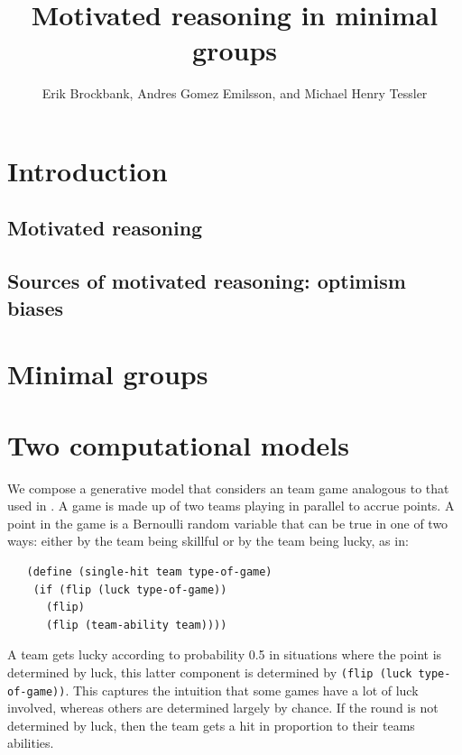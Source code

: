 \documentclass{article}
\begin{document}
 \title{Motivated reasoning in minimal groups}
\author{Erik Brockbank, Andres Gomez Emilsson, and Michael Henry Tessler} \renewcommand{\today}{Psych 241\\June 8,
2014} \maketitle

\section{Introduction}

\subsection{Motivated reasoning}

\subsection{Sources of motivated reasoning: optimism biases}

\section{Minimal groups}

\section{Two computational models}

We compose a generative model that considers an team game analogous to that used in \citet{Klein1992}. A game is made up of two teams playing in parallel to accrue points. A point in the game is a Bernoulli random variable that can be true in one of two ways: either by the team being skillful or by the team being lucky, as in:

\begin{lstlisting}
   (define (single-hit team type-of-game)
    (if (flip (luck type-of-game)) 
      (flip) 
      (flip (team-ability team))))
\end{lstlisting}

A team gets lucky according to probability 0.5 in situations where the point is determined by luck, this latter component is determined by \lstinline{(flip (luck type-of-game))}. This captures the intuition that some games have a lot of luck involved, whereas others are determined largely by chance. If the round is not determined by luck, then the team gets a hit in proportion to their teams abilities. 
\end{document}
